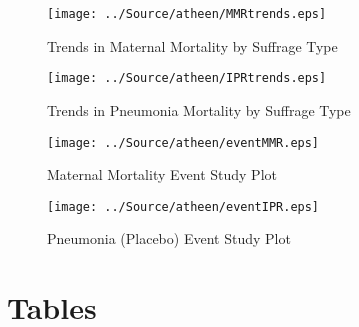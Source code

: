 \documentclass[11pt]{article}
\begin{document}
\begin{spacing}{1.4}
\begin{figure}[htpb!]
\begin{center}
\texttt{[image: ../Source/atheen/MMRtrends.eps]}
\caption{Trends in Maternal Mortality by Suffrage Type}
\label{trendMMR}
\end{center}
\end{figure}

\begin{figure}[htpb!]
\begin{center}
\texttt{[image: ../Source/atheen/IPRtrends.eps]}
\caption{Trends in Pneumonia Mortality by Suffrage Type}
\label{trendIPR}
\end{center}
\end{figure}

\begin{figure}[htpb!]
\begin{center}
\texttt{[image: ../Source/atheen/eventMMR.eps]}
\caption{Maternal Mortality Event Study Plot}
\label{eventMMR}
\end{center}
\end{figure}

\begin{figure}[htpb!]
\begin{center}
\texttt{[image: ../Source/atheen/eventIPR.eps]}
\caption{Pneumonia (Placebo) Event Study Plot}
\label{eventIPR}
\end{center}
\end{figure}

\newpage
\section*{Tables}







\begin{landscape}

\end{landscape}
\begin{landscape}

\end{landscape}
\begin{landscape}

\end{landscape}

\begin{landscape}

\end{landscape}\begin{landscape}

\end{landscape}




\end{spacing}
\end{document}
